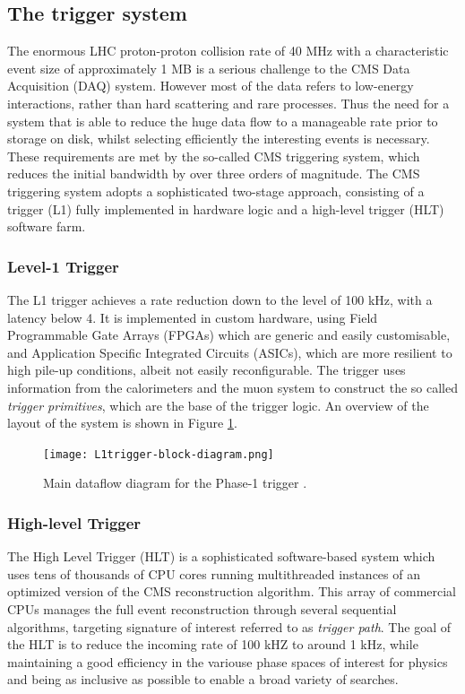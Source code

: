 \subsection{The trigger system}
The enormous LHC proton-proton collision rate of 40 MHz with a characteristic event size of approximately 1 MB
is a serious challenge to the CMS Data Acquisition (DAQ) system.
However most of the data refers to low-energy interactions, rather than hard scattering and rare processes.
Thus the need for a system that is able to reduce the huge data flow to a manageable rate prior to storage on disk,
whilst selecting efficiently the interesting events is necessary.
These requirements are met by the so-called CMS triggering system,
which reduces the initial bandwidth by over three orders of magnitude.
The CMS triggering system adopts a sophisticated two-stage approach,
consisting of a \Lone trigger (L1) fully implemented in hardware logic and a high-level trigger (HLT) software farm.

\subsubsection{Level-1 Trigger}
The L1 trigger achieves a rate reduction down to the level of 100 kHz, with a latency below 4\mus.
It is implemented in custom hardware, using Field Programmable Gate Arrays (FPGAs) which are generic and easily customisable,
and Application Specific Integrated Circuits (ASICs), which are more resilient to high pile-up conditions, albeit not easily reconfigurable.
The \Lone trigger uses information from the calorimeters and the muon system to construct the so called \textit{trigger primitives},
which are the base of the trigger logic.
An overview of the layout of the system is shown in Figure \ref{fig:L1trigger-block-diagram}.

\begin{figure}[thb]
  \centering
  \texttt{[image: L1trigger-block-diagram.png]}
  \caption{Main dataflow diagram for the Phase-1 \Lone trigger \cite{CMS-TDR-12}.}
  \label{fig:L1trigger-block-diagram}
\end{figure}

\subsubsection{High-level Trigger}
The High Level Trigger (HLT) is a sophisticated software-based system which uses tens of thousands of CPU cores
running multithreaded instances of an optimized version of the CMS reconstruction algorithm.
This array of commercial CPUs manages the full event reconstruction through several sequential algorithms,
targeting signature of interest referred to as \textit{trigger path}.
The goal of the HLT is to reduce the incoming \Lone rate of 100 kHZ to around 1 kHz,
while maintaining a good efficiency in the variouse phase spaces of interest for physics
and being as inclusive as possible to enable a broad variety of searches.

